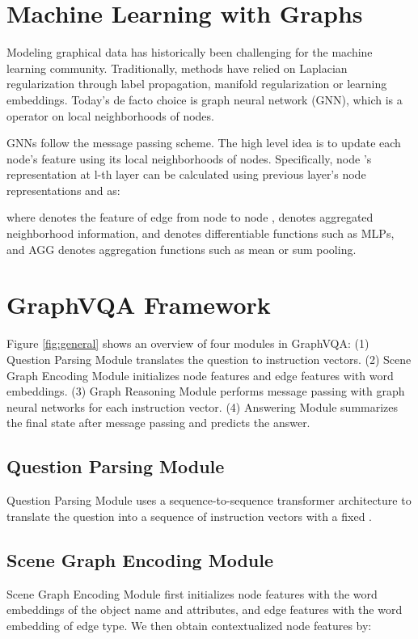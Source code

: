 \documentclass[11pt]{article}
\begin{document}
\section{Machine Learning with Graphs}

Modeling graphical data has historically been challenging for the machine learning community. Traditionally, methods have relied on Laplacian regularization through label propagation, manifold regularization or learning embeddings. 
Today's de facto choice is graph neural network (GNN), which is a operator on local neighborhoods of nodes. 


GNNs follow the message passing scheme. 
The high level idea is to update each node's feature using its local neighborhoods of nodes. 
Specifically, node 's representation at l-th layer  can be calculated using previous layer's node representations  and  as: 

where  denotes the feature of edge from node  to node ,  denotes aggregated neighborhood information,  and  denotes differentiable functions such as MLPs, and AGG denotes aggregation functions such as mean or sum pooling.


\section{GraphVQA Framework}
\label{sec:GraphVQA_framework}
Figure \ref{fig:general} shows an overview of four modules in GraphVQA: (1) Question Parsing Module translates the question to  instruction vectors. 
(2) Scene Graph Encoding Module initializes node features  and edge features  with word embeddings. 
(3) Graph Reasoning Module performs message passing with graph neural networks for each instruction vector. 
(4) Answering Module summarizes the final state after message passing and predicts the answer. 


\subsection{Question Parsing Module}


Question Parsing Module uses a sequence-to-sequence transformer architecture to translate the question  into a sequence of instruction vectors  with a fixed . 






\subsection{Scene Graph Encoding Module}
Scene Graph Encoding Module first initializes node features 
 with the word embeddings of the object name and attributes, and edge features  with the word embedding of edge type. 
We then obtain contextualized node features  by: 
\end{document}
